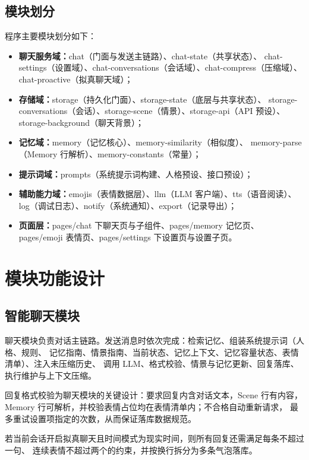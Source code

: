 \documentclass[zihao=5,a4paper]{ctexart}
\begin{document}
\subsection{模块划分}
程序主要模块划分如下：
\begin{itemize}[itemsep=0pt,parsep=0pt]
  \item \textbf{聊天服务域：}chat（门面与发送主链路）、chat-state（共享状态）、
        chat-settings（设置域）、chat-conversations（会话域）、chat-compress（压缩域）、
        chat-proactive（拟真聊天域）；
  \item \textbf{存储域：}storage（持久化门面）、storage-state（底层与共享状态）、
        storage-conversations（会话）、storage-scene（情景）、storage-api（API 预设）、
        storage-background（聊天背景）；
  \item \textbf{记忆域：}memory（记忆核心）、memory-similarity（相似度）、
        memory-parse（Memory 行解析）、memory-constants（常量）；
  \item \textbf{提示词域：}prompts（系统提示词构建、人格预设、接口预设）；
  \item \textbf{辅助能力域：}emojis（表情数据层）、llm（LLM 客户端）、tts（语音阅读）、
        log（调试日志）、notify（系统通知）、export（记录导出）；
  \item \textbf{页面层：}pages/chat 下聊天页与子组件、pages/memory 记忆页、
        pages/emoji 表情页、pages/settings 下设置页与设置子页。
\end{itemize}

\section{模块功能设计}

\subsection{智能聊天模块}
聊天模块负责对话主链路。发送消息时依次完成：检索记忆、组装系统提示词（人格、规则、
记忆指南、情景指南、当前状态、记忆上下文、记忆容量状态、表情清单）、注入未压缩历史、
调用 LLM、格式校验、情景与记忆更新、回复落库、执行维护与上下文压缩。

回复格式校验为聊天模块的关键设计：要求回复内含对话文本，Scene 行有内容，
Memory 行可解析，并校验表情占位均在表情清单内；不合格自动重新请求，
最多重试设置项指定的次数，从而保证落库数据规范。

若当前会话开启拟真聊天且时间模式为现实时间，则所有回复还需满足每条不超过一句、
连续表情不超过两个的约束，并按换行拆分为多条气泡落库。
\end{document}
